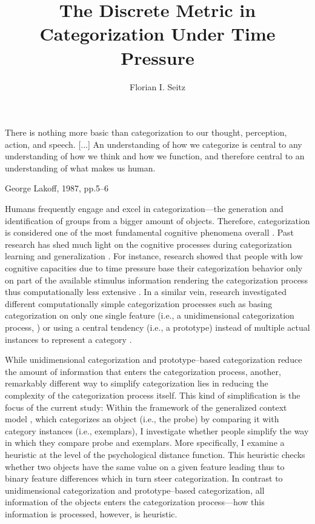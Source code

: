 \documentclass[a4paper,man,natbib]{apa6}
\title{The Discrete Metric in Categorization Under Time Pressure}
\author{Florian I. Seitz}
\affiliation{University of Basel}
\begin{document}
\maketitle

\epigraph{There is nothing more basic than categorization to our thought, perception, action, and speech. [...] An understanding of how we categorize is central to any understanding of how we think and how we function, and therefore central to an understanding of what makes us human.}{George Lakoff, 1987, pp.5--6}

Humans frequently engage and excel in categorization---the generation and identification of groups from a bigger amount of objects. Therefore, categorization is considered one of the most fundamental cognitive phenomena overall \citep{ashby2001categorization, bruner1956study, cohen2005bridging, lakoff1987women, goldstone2003concepts}. Past research has shed much light on the cognitive processes during categorization learning and generalization \citep[for an overview over the diverse cognitive models of categorization, see][]{kruschke2008models,wills2013models}. For instance, research 
showed that people with low cognitive capacities due to time pressure base their categorization behavior only on part of the available stimulus information rendering the categorization process thus computationally less extensive \citep{lamberts1995categorization, lamberts1998time, lamberts1999building, lamberts1999categorization, lamberts1997fast}. In a similar vein, research investigated different computationally simple categorization processes such as basing categorization on only one single feature (i.e., a unidimensional categorization process, \citealp{johansen2002there}) or using a central tendency (i.e., a prototype) instead of multiple actual instances to represent a category \citep{smith1998prototypes}. 

While unidimensional categorization and prototype--based categorization reduce the amount of information that enters the categorization process, another, remarkably different way to simplify categorization lies in reducing the complexity of the categorization process itself. This kind of simplification is the focus of the current study: Within the framework of the generalized context model \citep{nosofsky1986attention}, which categorizes an object (i.e., the probe) by comparing it with 
category instances (i.e., exemplars), I investigate whether people simplify the way in which they compare probe and exemplars. 
More specifically, I examine a heuristic at the level of the psychological distance function. This heuristic checks whether two objects have the same value on a given feature leading thus to binary feature differences which in turn steer categorization. In contrast to unidimensional categorization and prototype--based categorization, all information of the objects enters the categorization process---how this information is processed, however, is heuristic. 
\end{document}
